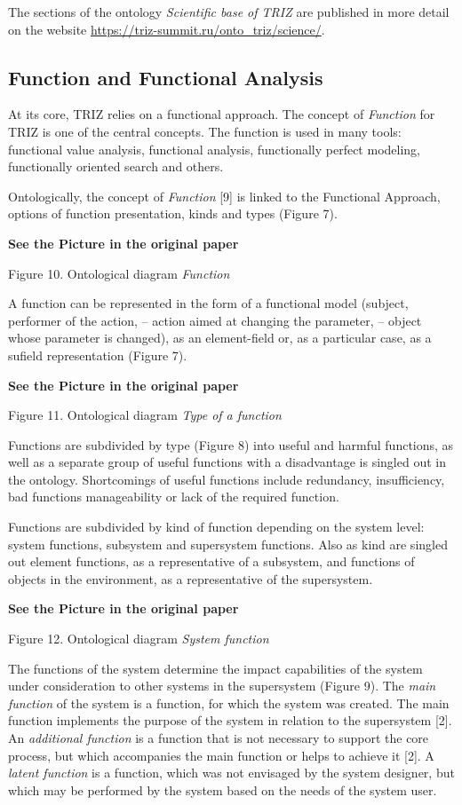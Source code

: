 \documentclass[11pt,a4paper]{article}
\newcommand{\addpicture}{\textbf{See the Picture in the original paper}\par}
\begin{document}
The sections of the ontology \emph{Scientific base of TRIZ} are published in
more detail on the website \url{https://triz-summit.ru/onto_triz/science/}.

\subsection{Function and Functional Analysis}

At its core, TRIZ relies on a functional approach. The concept of
\emph{Function} for TRIZ is one of the central concepts. The function is used
in many tools: functional value analysis, functional analysis, functionally
perfect modeling, functionally oriented search and others.

Ontologically, the concept of \emph{Function} [9] is linked to the Functional
Approach, options of function presentation, kinds and types (Figure 7).
\begin{center}
  \addpicture
  Figure 10. Ontological diagram \emph{Function}
\end{center}
A function can be represented in the form of a functional model (subject,
performer of the action, -- action aimed at changing the parameter, -- object
whose parameter is changed), as an element-field or, as a particular case,
as a sufield representation (Figure 7).
\begin{center}
  \addpicture
  Figure 11. Ontological diagram \emph{Type of a function}
\end{center}
Functions are subdivided by type (Figure 8) into useful and harmful functions,
as well as a separate group of useful functions with a disadvantage is singled
out in the ontology.  Shortcomings of useful functions include redundancy,
insufficiency, bad functions manageability or lack of the required function.

Functions are subdivided by kind of function depending on the system level:
system functions, subsystem and supersystem functions. Also as kind are
singled out element functions, as a representative of a subsystem, and
functions of objects in the environment, as a representative of the
supersystem.

\begin{center}
  \addpicture
  Figure 12. Ontological diagram \emph{System function}
\end{center}
The functions of the system determine the impact capabilities of the system
under consideration to other systems in the supersystem (Figure 9). The
\emph{main function} of the system is a function, for which the system was
created. The main function implements the purpose of the system in relation to
the supersystem [2]. An \emph{additional function} is a function that is not
necessary to support the core process, but which accompanies the main function
or helps to achieve it [2]. A \emph{latent function} is a function, which was
not envisaged by the system designer, but which may be performed by the system
based on the needs of the system user.
\end{document}
